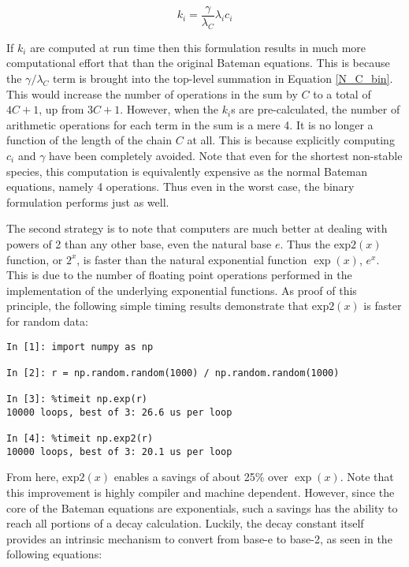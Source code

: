 \documentclass{anstrans}
\begin{document}
\begin{equation}
\label{k_i}
k_i = \frac{\gamma}{\lambda_C} \lambda_i c_i
\end{equation}

If $k_i$ are computed at run time then this formulation results in much 
more computational effort that than the original Bateman equations. This is 
because the $\gamma/\lambda_C$ term is brought into the top-level summation 
in Equation \ref{N_C_bin}. This would increase the number of operations in the 
sum by $C$ to a total of $4C+1$, up from $3C+1$.
However, when the $k_i$s  are pre-calculated, 
the number of arithmetic operations for each term in the sum is a mere 4.
It is no longer a function of the length of the chain $C$ at all.  This is 
because explicitly computing $c_i$ and $\gamma$ have been completely avoided.
Note that even for the shortest non-stable species, this computation is 
equivalently expensive as the normal Bateman equations, namely 4 operations.
Thus even in the worst case, the binary formulation performs just as well.

The second strategy is to note that computers are much better at dealing 
with powers of 2 than any other base, even the natural base $e$. Thus the 
$\mathrm{exp2}(x)$ function, or $2^x$, is faster than the natural exponential 
function $\exp(x)$, $e^x$.  This is due to the number of floating point
operations performed in the implementation of the underlying exponential 
functions. As proof of this principle, the following simple timing results
demonstrate that $\mathrm{exp2}(x)$ is faster for random data:

\begin{lstlisting}[caption={Exponential Timing Comparison}, 
                   label=expcmp]
In [1]: import numpy as np

In [2]: r = np.random.random(1000) / np.random.random(1000)

In [3]: %timeit np.exp(r)
10000 loops, best of 3: 26.6 us per loop

In [4]: %timeit np.exp2(r)
10000 loops, best of 3: 20.1 us per loop
\end{lstlisting}

From here, $\mathrm{exp2}(x)$ enables a savings of about 25\% over 
$\exp(x)$. Note that this improvement is highly compiler and machine dependent.
However, since the core of the Bateman equations are exponentials, 
such a savings has the ability to reach all portions of a decay calculation.
Luckily, the decay constant itself provides an intrinsic mechanism to convert 
from base-e to base-2, as seen in the following equations:
\end{document}
